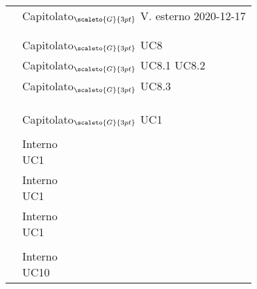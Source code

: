 {{{{\def\tabularxcolumn#1{m{#1}}
{
	\begin{center}
		\renewcommand{\arraystretch}{1.4}
		\begin{longtable}{|p{7.5cm}|p{7.5cm}|}
		\hline
		\rowcolor{airforceblue}
		\makecell[tc]{\textbf{Codice RS}} & \makecell[c]{\textbf{Fonte}}  \\
		\hline
		\makecell[tc]{RSFO1} & \makecell[tc]{Capitolato$_{\scaleto{G}{3pt}}$\\V. esterno 2020-12-17} \\
		\hline
		\makecell[tc]{RSFF2} & \makecell[tc]{Capitolato$_{\scaleto{G}{3pt}}$}\\
		\hline
		\makecell[tc]{RSFO3} & \makecell[tc]{UC2}\\
		\hline
		\makecell[tc]{RSFO4} & \makecell[tc]{Capitolato$_{\scaleto{G}{3pt}}$\\UC8}\\
		\hline
		\makecell[tc]{RSFO4.1} & \makecell[tc]{Capitolato$_{\scaleto{G}{3pt}}$\\UC8.1 \\ UC8.2}\\
		\hline
		\makecell[tc]{RSFO4.2} & \makecell[tc]{Capitolato$_{\scaleto{G}{3pt}}$\\UC8.3}\\
		\hline
		\makecell[tc]{RSFO5} & \makecell[tc]{Capitolato$_{\scaleto{G}{3pt}}$}\\
		\hline
		\makecell[tc]{RSFD5.1} & \makecell[tc]{Capitolato$_{\scaleto{G}{3pt}}$}\\
		\hline
		\makecell[tc]{RSFD6}& \makecell[tc]{Capitolato$_{\scaleto{G}{3pt}}$}\\
		\hline
		\makecell[tc]{RSFO7} & \makecell[tc]{Capitolato$_{\scaleto{G}{3pt}}$\\UC1}\\
		\hline
		\makecell[tc]{RSFO8} & \makecell[tc]{Interno}\\
		\hline
		\makecell[tc]{RSFO9} & \makecell[tc]{Interno \\ UC1}\\
		\hline
		\makecell[tc]{RSFO10} & \makecell[tc]{Interno \\ UC1}\\
		\hline
		\makecell[tc]{RSFO11} & \makecell[tc]{Interno \\ UC1}\\
		\hline
		\makecell[tc]{RSFF12} & \makecell[tc]{Interno}\\
		\hline
		\makecell[tc]{RSFD13} & \makecell[tc]{Interno \\ UC10}\\

\end{longtable}
\end{center}}}}}}
